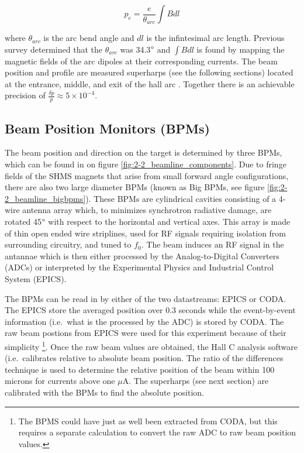 \documentclass[
]{report}
\begin{document}
\begin{equation} 
  p_e=\frac{e}{\theta_{arc}}\int B dl
  \label{eq:electron_momentum} 
\end{equation}

where \(\theta_{arc}\) is the arc bend angle and \(dl\) is the
infintesimal arc length. Previous survey determined that the
\(\theta_{arc}\) was 34.3\(\degree\) and \(\int B dl\) is found by
mapping the magnetic fields of the arc dipoles at their corresponding
currents. The beam position and profile are measured superharps (see the
following sections) located at the entrance, middle, and exit of the
hall arc \cite{yan_superharp_1995}. Together there is an achievable
precision of \(\frac{\delta p}{p}\approx 5\times 10^{-4}\).

\hypertarget{beam-position-monitors-bpms}{%
\subsection{Beam Position Monitors
(BPMs)}\label{beam-position-monitors-bpms}}

The beam position and direction on the target is determined by three
BPMs, which can be found in on figure \ref{fig:2-2_beamline_components}.
Due to fringe fields of the SHMS magnets that arise from small forward
angle configurations, there are also two large diameter BPMs (known as
Big BPMs, see figure \ref{fig:2-2_beamline_bigbpms}). These BPMs are
cylindrical cavities consisting of a 4-wire antenna array which, to
minimizes synchrotron radiative damage, are rotated 45\(\degree\) with
respect to the horizontal and vertical axes. This array is made of thin
open ended wire striplines, used for RF signals requiring isolation from
surrounding circuitry, and tuned to \(f_0\). The beam induces an RF
signal in the antannae which is then either processed by the
Analog-to-Digital Converters (ADCs) or interpreted by the Experimental
Physics and Industrial Control System (EPICS).



The BPMs can be read in by either of the two datastreams: EPICS or CODA.
The EPICS store the averaged position over 0.3 seconds while the
event-by-event information (i.e.~what is the processed by the ADC) is
stored by CODA. The raw beam postions from EPICS were used for this
experiment because of their simplicity
\footnote{The BPMS could have just as well been extracted from CODA, but this requires a separate calculation to convert the raw ADC to raw beam position values.}.
Once the raw beam values are obtained, the Hall C analysis software
(i.e.~calibrates relative to absolute beam position. The ratio of the
differences technique is used to determine the relative position of the
beam within 100 microns for currents above one \(\mu\)A. The superharps
(see next section) are calibrated with the BPMs to find the absolute
position.
\end{document}

